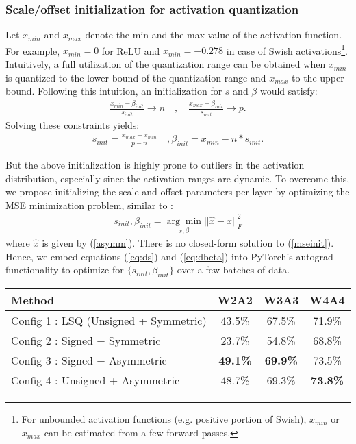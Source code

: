 \documentclass[10pt,twocolumn,letterpaper]{article}
\begin{document}
\subsubsection{Scale/offset initialization for activation quantization}
Let $x_{min}$ and $x_{max}$ denote the min and the max value of the activation function. For example, $x_{min}=0$ for ReLU and $x_{min}=-0.278$ in case of Swish activations\footnote{For unbounded activation functions (e.g. positive portion of Swish), $x_{min}$ or $x_{max}$ can be estimated from a few forward passes.}. Intuitively, a full utilization of the quantization range can be obtained when $x_{min}$ is quantized to the lower bound of the quantization range and $x_{max}$ to the upper bound. Following this intuition, an initialization for $s$ and $\beta$ would satisfy:
\begin{align}
    \frac{x_{min}-\beta_{init}}{s_{init}}\xrightarrow{}n \quad , \quad \frac{x_{max}-\beta_{init}}{s_{init}}\xrightarrow{}p.
    \label{minmax}
\end{align}
Solving these constraints yields:
\begin{align}
    s_{init}=\frac{x_{max}-x_{min}}{p-n} \quad ,  \beta_{init}=x_{min}-n*s_{init}.
    \label{minmaxinit}
\end{align}

But the above initialization is highly prone to outliers in the activation distribution, especially since the activation ranges are dynamic. To overcome this, we propose initializing the scale and offset parameters per layer by optimizing the MSE minimization problem, similar to \cite{mse1,mse3}:
\begin{align}
    s_{init}, \beta_{init} = \underset{s,\beta}{\arg\min} ||\hat{x}-x||^2_F
    \label{mseinit}
\end{align}where $\hat{x}$ is given by (\ref{asymm}). There is no closed-form solution to (\ref{mseinit}). Hence, we embed equations (\ref{eq:ds}) and (\ref{eq:dbeta}) into PyTorch's autograd functionality to optimize for $\{s_{init},\beta_{init}\}$ over a few batches of data.



\begin{table*}[t]
	\caption{Comparison of all configurations of quantization with EfficientNet-B0 (FP accuracy: 76.1\%)}
\centering
	\begin{tabular}{l | c| c | c }
        \toprule
        	{Method} & {W2A2} & {W3A3} & {W4A4} \\
			
			\midrule
	
			Config 1 : LSQ (Unsigned + Symmetric) & 43.5\% & 67.5\% & 71.9\% \\
			Config 2 : Signed + Symmetric & 23.7\% & 54.8\% & 68.8\%  \\
			Config 3 : Signed + Asymmetric & \textbf{49.1\%} & \textbf{69.9\%} & 73.5\%  \\
			Config 4 : Unsigned + Asymmetric & 48.7\% & 69.3\% & \textbf{73.8\%} \\
        \bottomrule
	\end{tabular}
	\label{table:efficientnet}
\end{table*}
\end{document}
